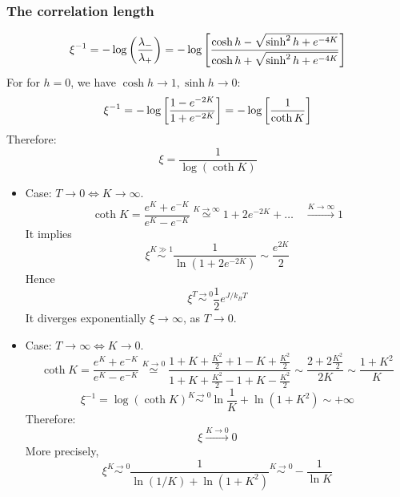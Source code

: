 \documentclass[../main/main.tex]{subfiles}
\begin{document}
\subsubsection{The correlation length}
\begin{equation}
  \xi ^{-1} = -\log{\qty(\frac{\lambda _-}{\lambda _+}) } = - \log{\qty[ \frac{\cosh h - \sqrt{\sinh^2 h + e^{-4K} } }{\cosh h + \sqrt{\sinh^2 h + e^{-4K} }}] }
\end{equation}
For  for \( h=0 \), we have \( \cosh h \rightarrow 1, \sinh h \rightarrow 0 \):
\begin{equation}
  \xi ^{-1} = - \log{\qty[\frac{1- e^{-2K} }{1+ e^{-2K} }] } =  - \log{\qty[\frac{1 }{\coth K }] }
\end{equation}
Therefore:
\begin{equation}
  \xi = \frac{1}{\log{ (\coth K )} }
\end{equation}
\begin{itemize}
\item Case: \( T \rightarrow 0 \Leftrightarrow K \rightarrow \infty  \).
\begin{equation}
  \coth K = \frac{e^{K} + e^{-K}  }{e^{K} - e^{-K}  } \overset{K \rightarrow \infty }{\simeq} 1 + 2 e^{-2K} + \dots \quad \overset{K \rightarrow \infty }{ \longrightarrow  } 1
\end{equation}
It implies
\begin{equation}
  \xi \overset{K \gg 1}{\sim } \frac{1}{\ln{(1+ 2 e^{-2K} )} } \sim \frac{e^{2K} }{2}
\end{equation}
Hence
\begin{equation}
  \xi \overset{T \rightarrow 0}{\sim } \frac{1}{2} e^{J/k_B T}
\end{equation}
It diverges exponentially \( \xi  \rightarrow \infty  \), as \( T \rightarrow 0 \).
\item Case: \( T \rightarrow \infty \Leftrightarrow K \rightarrow 0 \).
\begin{equation}
  \coth K = \frac{e^{K} + e^{-K}  }{e^{K} - e^{-K}  } \overset{K \rightarrow 0 }{\simeq}
  \frac{1+K+\frac{K^2}{2}+1-K+\frac{K^2}{2}}{1+K+\frac{K^2}{2}-1+K-\frac{K^2}{2}}
  \sim \frac{2+2 \frac{K^2}{2}}{2K} \sim \frac{1+K^2}{K}
\end{equation}
\begin{equation}
  \xi ^{-1} = \log{(\coth K)} \overset{K \rightarrow 0}{\sim } \ln{\frac{1}{K}} + \ln{(1+K^2)} \sim + \infty
\end{equation}
Therefore:
\begin{equation}
  \xi  \overset{K \rightarrow 0}{\longrightarrow} 0
\end{equation}
More precisely,
\begin{equation}
  \xi \overset{K \rightarrow 0}{\sim } \frac{1}{\ln{(1/K)} + \ln{(1+K^2)}  } \overset{K \rightarrow 0}{\sim } - \frac{1}{\ln{K} }
\end{equation}

\end{itemize}
\end{document}
